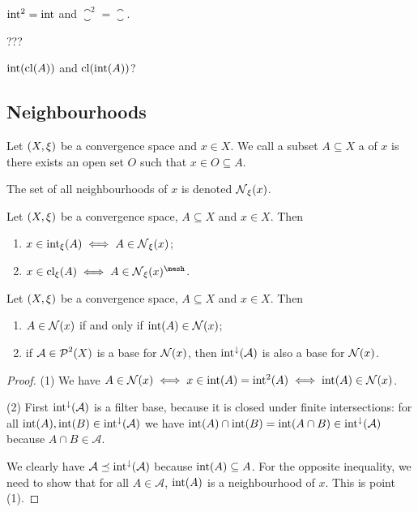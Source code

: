 \begin{lemma}
$\operatorname{int}^2 = \operatorname{int}$ and $\closure^2 = \closure$.
\end{lemma}

\begin{proposition}
???

$\operatorname{int}(\operatorname{cl}(A))$ and $\operatorname{cl}(\operatorname{int}(A))$?
\end{proposition}

\subsection{Neighbourhoods}
\begin{definition}
Let $\left( X,\xi \right)$ be a convergence space and $x\in X$. We call a subset $A\subseteq X$ a  of $x$ is there exists an open set $O$ such that $x\in O \subseteq A$.

The set of all neighbourhoods of $x$ is denoted $\operatorname{\mathcal{N}}_\xi(x)$.
\end{definition}

\begin{proposition} \label{interiorClosureMembership}
Let $\left( X,\xi \right)$ be a convergence space, $A\subseteq X$ and $x\in X$. Then
\begin{enumerate}
\item $x\in \operatorname{int}_\xi(A) \iff A \in \operatorname{\mathcal{N}}_\xi(x)$;
\item $x\in \closure_\xi(A) \iff A \in \neighbourhood_\xi(x)^{\mesh}$.
\end{enumerate}
\end{proposition}

\begin{lemma} \label{interiorModificationNeighbourhoods}
Let $\left( X,\xi \right)$ be a convergence space, $A\subseteq X$ and $x\in X$. Then
\begin{enumerate}
\item $A\in\operatorname{\mathcal{N}}(x)$ \textup{if and only if} $\operatorname{int}(A)\in\operatorname{\mathcal{N}}(x)$;
\item if $\mathcal{A}\in\operatorname{\mathcal{P}}^2(X)$ is a base for $\operatorname{\mathcal{N}}(x)$, then $\operatorname{int}^{\downarrow}(\mathcal{A})$ is also a base for $\operatorname{\mathcal{N}}(x)$.
\end{enumerate}
\end{lemma}
\begin{proof}
(1) We have $A\in\operatorname{\mathcal{N}}(x) \iff x\in \operatorname{int}(A) = \operatorname{int}^2(A) \iff \operatorname{int}(A) \in \operatorname{\mathcal{N}}(x)$.

(2) First $\operatorname{int}^{\downarrow}(\mathcal{A})$ is a filter base, because it is closed under finite intersections: for all $\operatorname{int}(A),\operatorname{int}(B)\in \operatorname{int}^{\downarrow}(\mathcal{A})$ we have $\operatorname{int}(A)\cap\operatorname{int}(B) = \operatorname{int}(A\cap B) \in \operatorname{int}^{\downarrow}(\mathcal{A})$ because $A\cap B \in \mathcal{A}$.

We clearly have $\mathcal{A} \preceq \operatorname{int}^{\downarrow}(\mathcal{A})$ because $\operatorname{int}(A) \subseteq A$. For the opposite inequality, we need to show that for all $A\in \mathcal{A}$, $\operatorname{int}(A)$ is a neighbourhood of $x$. This is point (1).
\end{proof}

